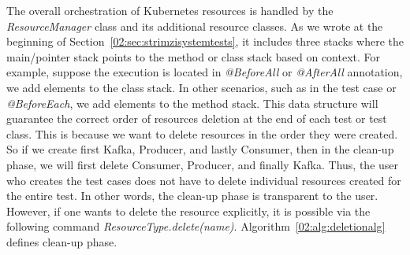 The overall orchestration of Kubernetes resources is handled by the \emph{ResourceManager} class and its additional resource classes.
As we wrote at the beginning of Section~\ref{02:sec:strimzisystemtests}, it includes three stacks where the main/pointer stack points to the method or class stack based on context.
For example, suppose the execution is located in \emph{@BeforeAll} or \emph{@AfterAll} annotation, we add elements to the class stack.
In other scenarios, such as in the test case or \emph{@BeforeEach}, we add elements to the method stack.
This data structure will guarantee the correct order of resources deletion at the end of each test or test class.
This is because we want to delete resources in the order they were created.
So if we create first Kafka, Producer, and lastly Consumer, then in the clean-up phase, we will first delete Consumer, Producer, and finally Kafka.
Thus, the user who creates the test cases does not have to delete individual resources created for the entire test.
In other words, the clean-up phase is transparent to the user.
However, if one wants to delete the resource explicitly, it is possible via the following command \emph{ResourceType.delete(name)}.
Algorithm~\ref{02:alg:deletionalg} defines clean-up phase.


